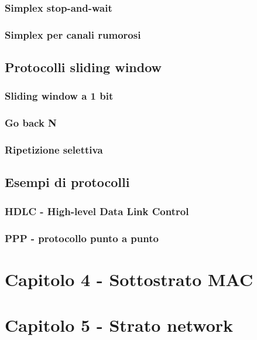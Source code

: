 \subsubsection{Simplex stop-and-wait}

\subsubsection{Simplex per canali rumorosi}


\subsection{Protocolli sliding window} %

\subsubsection{Sliding window a 1 bit}

\subsubsection{Go back N}

\subsubsection{Ripetizione selettiva}


\subsection{Esempi di protocolli} %

\subsubsection{HDLC - High-level Data Link Control}

\subsubsection{PPP - protocollo punto a punto}


\newpage
\section{Capitolo 4 - Sottostrato MAC}


\newpage
\section{Capitolo 5 - Strato network}


